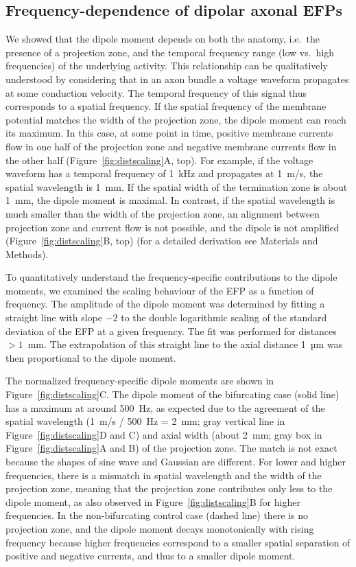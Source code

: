 \documentclass[]{elife}
\begin{document}
\subsection{Frequency-dependence of dipolar axonal
EFPs}\label{frequency-dependence-of-dipolar-axonal-efps}

We showed that the dipole moment depends on both the anatomy, i.e.~the
presence of a projection zone, and the temporal frequency range (low
vs.~high frequencies) of the underlying activity. This relationship can
be qualitatively understood by considering that in an axon bundle a
voltage waveform propagates at some conduction velocity. The temporal
frequency of this signal thus corresponds to a spatial frequency. If the
spatial frequency of the membrane potential matches the width of the
projection zone, the dipole moment can reach its maximum. In this case,
at some point in time, positive membrane currents flow in one half of
the projection zone and negative membrane currents flow in the other
half (Figure~\ref{fig:distscaling}A, top). For example, if the voltage
waveform has a temporal frequency of 1~kHz and propagates at 1~m/s, the
spatial wavelength is 1~mm. If the spatial width of the termination zone
is about 1~mm, the dipole moment is maximal. In contrast, if the spatial
wavelength is much smaller than the width of the projection zone, an
alignment between projection zone and current flow is not possible, and
the dipole is not amplified (Figure~\ref{fig:distscaling}B, top) (for a
detailed derivation see Materials and Methods).

To quantitatively understand the frequency-specific contributions to the
dipole moments, we examined the scaling behaviour of the EFP as a
function of frequency. The amplitude of the dipole moment was determined
by fitting a straight line with slope \(-2\) to the double logarithmic
scaling of the standard deviation of the EFP at a given frequency. The
fit was performed for distances \(> 1\)~mm. The extrapolation of this
straight line to the axial distance 1~µm was then proportional to the
dipole moment.

The normalized frequency-specific dipole moments are shown in
Figure~\ref{fig:distscaling}C. The dipole moment of the bifurcating case
(solid line) has a maximum at around 500~Hz, as expected due to the
agreement of the spatial wavelength (1~m/s / 500~Hz = 2~mm; gray
vertical line in Figure~\ref{fig:distscaling}D and C) and axial width
(about 2~mm; gray box in Figure~\ref{fig:distscaling}A and B) of the
projection zone. The match is not exact because the shapes of sine wave
and Gaussian are different. For lower and higher frequencies, there is a
mismatch in spatial wavelength and the width of the projection zone,
meaning that the projection zone contributes only less to the dipole
moment, as also observed in Figure~\ref{fig:distscaling}B for higher
frequencies. In the non-bifurcating control case (dashed line) there is
no projection zone, and the dipole moment decays monotonically with
rising frequency because higher frequencies correspond to a smaller
spatial separation of positive and negative currents, and thus to a
smaller dipole moment.
\end{document}
